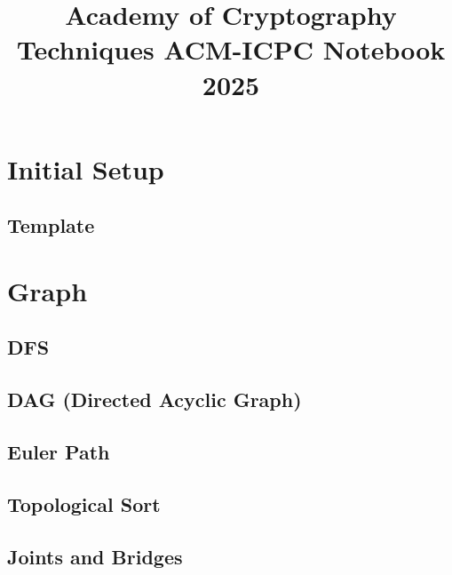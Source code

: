 \documentclass[10pt]{article}
\title{\vspace{-4ex}\Large{Academy of Cryptography Techniques ACM-ICPC Notebook 2025}}
\author{}
\date{}
\begin{document}
\begin{landscape}
\begin{multicols}{2}

\maketitle
\vspace{-13ex}
\tableofcontents
\pagestyle{fancy}

\section{Initial Setup}
\subsection{Template}


\section{Graph}
\subsection{DFS}


\subsection{DAG (Directed Acyclic Graph)}


\subsection{Euler Path}


\subsection{Topological Sort}


\subsection{Joints and Bridges}



\end{multicols}
\end{landscape}
\end{document}
